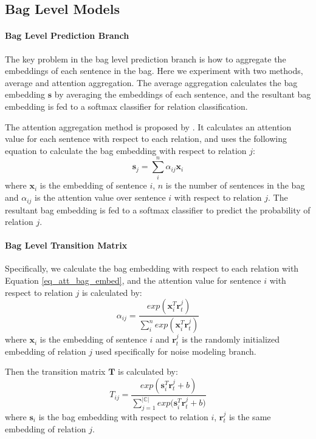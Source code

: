 \subsection{Bag Level Models}
\paragraph{Bag Level Prediction Branch}
The key problem in the bag level prediction branch is how to aggregate the embeddings of each sentence in the bag. Here we experiment with two methods, average and attention aggregation. The average aggregation calculates the bag embedding $\mathbf{s}$ by averaging the embeddings of each sentence, and the resultant bag embedding is fed to a softmax classifier for relation classification.

The attention aggregation method is proposed by \cite{lin2016neural}. It calculates an attention value for each sentence with respect to each relation, and uses the following equation to calculate the bag embedding with respect to relation $j$:
\begin{equation}
\mathbf{s}_j = \sum_i^{n}{\alpha_{ij} \mathbf{x}_{i}}
\label{eq_att_bag_embed}
\end{equation}
where $\mathbf{x}_{i}$ is the embedding of sentence $i$, $n$ is the number of sentences in the bag and $\alpha_{ij}$ is the attention value over sentence $i$ with respect to relation $j$. The resultant bag embedding is fed to a softmax classifier to predict the probability of relation $j$.

\paragraph{Bag Level Transition Matrix}
 Specifically, we calculate the bag embedding with respect to each relation with Equation \ref{eq_att_bag_embed}, and the attention value for sentence $i$ with respect to relation $j$ is calculated by:
\begin{equation}
\alpha_{ij} = \frac{exp(\mathbf{x}_i^T \mathbf{r}_t^j)}{\sum_i^n{exp(\mathbf{x}_i^T \mathbf{r}_t^j)}}
\end{equation}
where $\mathbf{x}_i$ is the embedding of sentence $i$ and $\mathbf{r}_t^j$ is the randomly initialized embedding of relation $j$ used specifically for noise modeling branch.

Then the transition matrix $\mathbf{T}$ is calculated by:
\begin{equation}
T_{ij} = \frac{exp({\mathbf{s}_i^T \mathbf{r}_t^j  + b})}{\sum_{j=1}^{|\mathbb{C}|}{exp(\mathbf{s}_i^T \mathbf{r}_t^j + b})}
\end{equation}
where $\mathbf{s}_i$ is the bag embedding with respect to relation $i$, $\mathbf{r}_t^j$ is the same embedding of relation $j$.


